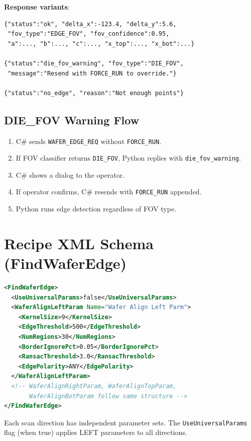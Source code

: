 \documentclass[11pt,a4paper]{article}
\begin{document}
\textbf{Response variants}:
\begin{lstlisting}[language={}]
{"status":"ok", "delta_x":-123.4, "delta_y":5.6,
 "fov_type":"EDGE_FOV", "fov_confidence":0.95,
 "a":..., "b":..., "c":..., "x_top":..., "x_bot":...}

{"status":"die_fov_warning", "fov_type":"DIE_FOV",
 "message":"Resend with FORCE_RUN to override."}

{"status":"no_edge", "reason":"Not enough points"}
\end{lstlisting}

\subsection{DIE\_FOV Warning Flow}
\begin{enumerate}
\item C\# sends \texttt{WAFER\_EDGE\_REQ} without \texttt{FORCE\_RUN}.
\item If FOV classifier returns \texttt{DIE\_FOV}, Python replies with \texttt{die\_fov\_warning}.
\item C\# shows a dialog to the operator.
\item If operator confirms, C\# resends with \texttt{FORCE\_RUN} appended.
\item Python runs edge detection regardless of FOV type.
\end{enumerate}

\section{Recipe XML Schema (FindWaferEdge)}
\begin{lstlisting}[language=XML]
<FindWaferEdge>
  <UseUniversalParams>false</UseUniversalParams>
  <WaferAlignLeftParam Name="Wafer Align Left Parm">
    <KernelSize>9</KernelSize>
    <EdgeThreshold>500</EdgeThreshold>
    <NumRegions>30</NumRegions>
    <BorderIgnorePct>0.05</BorderIgnorePct>
    <RansacThreshold>3.0</RansacThreshold>
    <EdgePolarity>ANY</EdgePolarity>
  </WaferAlignLeftParam>
  <!-- WaferAlignRightParam, WaferAlignTopParam,
       WaferAlignBotParam follow same structure -->
</FindWaferEdge>
\end{lstlisting}

Each scan direction has independent parameter sets. The \texttt{UseUniversalParams} flag (when true) applies LEFT parameters to all directions.

\end{document}
